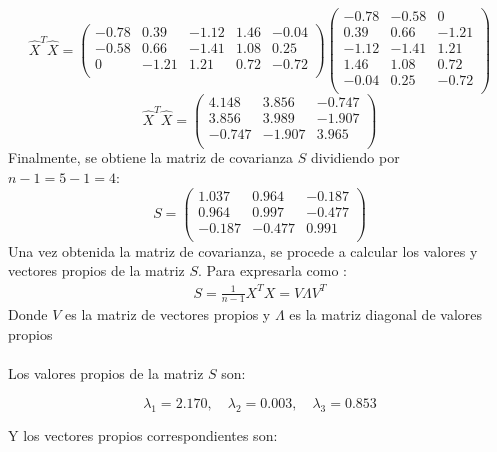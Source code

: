 \documentclass[
  11pt,
  letterpaper,
   addpoints,
   answers
  ]{exam}
\begin{document}
\begin{questions}
\begin{solution}
\[
\hat{X}^T \hat{X} = \begin{pmatrix}
-0.78 & 0.39 & -1.12 & 1.46 & -0.04 \\
-0.58 & 0.66 & -1.41 & 1.08 & 0.25 \\
0 & -1.21 & 1.21 & 0.72 & -0.72 \\
\end{pmatrix}
\begin{pmatrix}
-0.78 & -0.58 & 0 \\
0.39 & 0.66 & -1.21 \\
-1.12 & -1.41 & 1.21 \\
1.46 & 1.08 & 0.72 \\
-0.04 & 0.25 & -0.72 \\
\end{pmatrix}
\]
\[
\hat{X}^T \hat{X} = \begin{pmatrix}
4.148 & 3.856 & -0.747 \\
3.856 & 3.989 & -1.907 \\
-0.747 & -1.907 & 3.965 \\
\end{pmatrix}
\]
Finalmente, se obtiene la matriz de covarianza \( S \) dividiendo por \( n-1 = 5-1 = 4 \):
\[
S = \begin{pmatrix}
1.037 & 0.964 & -0.187 \\
0.964 & 0.997 & -0.477 \\
-0.187 & -0.477 & 0.991 \\
\end{pmatrix}
\]
Una vez obtenida la matriz de covarianza, se procede a calcular los valores y vectores propios de la matriz \( S \). Para expresarla como :
\begin{align}
    S= \frac{1}{n-1}X^{T}X = V \Lambda V^{T}
\end{align}
Donde \(V\) es la matriz de vectores propios y \(\Lambda\) es la matriz diagonal de valores propios\\\\
    
Los valores propios de la matriz \( S \) son:

\[
\lambda_1 = 2.170, \quad \lambda_2 = 0.003, \quad \lambda_3 = 0.853
\]

Y los vectores propios correspondientes son:


\end{solution}
\end{questions}
\end{document}
